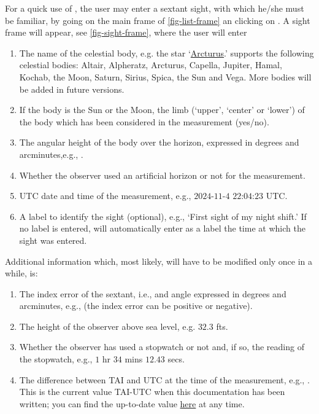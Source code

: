 \documentclass{ol-softwaremanual}
\begin{document}
For a quick use of \thel, the user may enter a sextant sight, with which he/she must be familiar, by going on the main frame of \cref{fig-list-frame} an clicking on . A sight frame will appear, see \cref{fig-sight-frame}, where the user will enter
\begin{enumerate}
  \item \label{item-name} The name of the celestial body, e.g. the star `\href{https://fr.wikipedia.org/wiki/Arcturus}{Arcturus}.' \thel supports the following celestial bodies: Altair, Alpheratz, Arcturus, Capella, Jupiter, Hamal, Kochab, the Moon, Saturn, Sirius, Spica, the Sun and Vega. More bodies will be added in future versions. 
  \item \label{item-limb}  If the body is the Sun or the Moon, the  limb (`upper', `center' or `lower') of the body which has been considered in the measurement (yes/no).
  \item \label{item-body-height} The angular height of the  body over the horizon, expressed in degrees and arcminutes,e.g., .
  \item \label{item-artificial-horizon} Whether the observer used an artificial horizon or not for the measurement.
  \item \label{item-time} \ac{UTC} date and time of the measurement, e.g., $2024$-$11$-$4$ $22$:$04$:$23$ \ac{UTC}.
  \item \label{item-label} A label to identify the sight (optional), e.g., `First sight of my night shift.' If no label is entered, \thel will automatically enter as a label the time at which the sight was entered. 
  \end{enumerate}
  
  Additional information which, most likely, will have to be modified only once in a while, is: 
  \begin{enumerate}[resume]
    \item \label{item-index-error} The index error \cite{bowditch2002the} of the sextant,  i.e., and angle expressed in degrees and arcminutes, e.g.,  (the index error can be positive or negative).
    \item \label{item-observer-height} The height of the observer above sea level, e.g. $32.3$ \acp{ft}.
    \item \label{item-stopwatch} Whether the observer has used a stopwatch or not and, if so, the reading of the stopwatch, e.g., $1$ \ac{hr}  $34$ \acp{min} $12.43$ \acp{sec}.
    \item \label{item-tai-utc} The difference between \ac{TAI} and \ac{UTC} at the time of the measurement, e.g., .  This is the current value  \ac{TAI}-\ac{UTC} when this documentation has been written; you can find the up-to-date value  \href{https://en.wikipedia.org/wiki/Leap_second}{here} at any time. 
  \end{enumerate}
\end{document}
